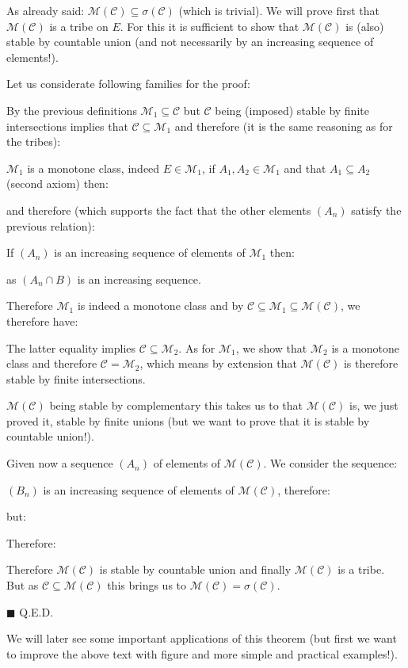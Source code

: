 	\begin{dem}
	As already said: $\mathcal{M}(\mathcal{C})\subseteq \sigma(\mathcal{C})$ (which is trivial). We will prove first that $\mathcal{M}(\mathcal{C})$ is a tribe on $E$. For this it is sufficient to show that $\mathcal{M}(\mathcal{C})$ is (also) stable by countable union (and not necessarily by an increasing sequence of elements!).
	
	Let us considerate following families for the proof:
	
	By the previous definitions $\mathcal{M}_1\subseteq \mathcal{C}$ but $\mathcal{C}$ being (imposed) stable by finite intersections implies that $\mathcal{C}\subseteq \mathcal{M}_1$ and therefore (it is the same reasoning as for the tribes):
	
	$\mathcal{M}_1$ is a monotone class, indeed $E\in \mathcal{M}_1$, if $A_1,A_2 \in \mathcal{M}_1$ and that $A_1\subseteq A_2$ (second axiom) then:	
	
	and therefore (which supports the fact that the other elements $(A_n)$ satisfy the previous relation):
	
	If $(A_n)$ is an increasing sequence of elements of $\mathcal{M}_1$ then:
	
	as $(A_n\cap B)$ is an increasing sequence.
	
	Therefore $\mathcal{M}_1$ is indeed a monotone class and by $\mathcal{C}\subseteq \mathcal{M}_1 \subseteq \mathcal{M}(\mathcal{C})$, we therefore have:
	
	The latter equality implies $\mathcal{C}\subseteq \mathcal{M}_2$. As for $\mathcal{M}_1$, we show that $\mathcal{M}_2$ is a monotone class and therefore $\mathcal{C}= \mathcal{M}_2$, which means by extension that $\mathcal{M}(\mathcal{C})$ is therefore stable by finite intersections.
	
	$\mathcal{M}(\mathcal{C})$ being stable by complementary this takes us to that $\mathcal{M}(\mathcal{C})$ is, we just proved it, stable by finite unions (but we want to prove that it is stable by countable union!).
	
	Given now a sequence $(A_n)$ of elements of $\mathcal{M}(\mathcal{C})$. We consider the sequence:
	
	$(B_n)$ is an increasing sequence of elements of $\mathcal{M}(\mathcal{C})$, therefore:
	
	but:
	
	Therefore:
	
	Therefore $\mathcal{M}(\mathcal{C})$ is stable by countable union and finally $\mathcal{M}(\mathcal{C})$ is a tribe. But as $\mathcal{C}\subseteq \mathcal{M}(\mathcal{C})$ this brings us to $\mathcal{M}(\mathcal{C})=\sigma(\mathcal{C})$.
	\begin{flushright}
		$\blacksquare$  Q.E.D.
	\end{flushright}
	\end{dem}
	We will later see some important applications of this theorem (but first we want to improve the above text with figure and more simple and practical examples!).
	
